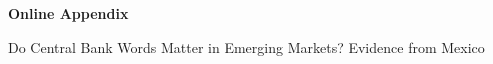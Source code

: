 \documentclass[a4paper, 12pt]{article}
\begin{document}
\newpage
\begin{appendices}
	
	\setcounter{page}{1}
	\renewcommand{\thetable}{A.\arabic{table}}
	\renewcommand\thefigure{A.\arabic{figure}}
	
	\section*{} \label{sec:apptblsfigs}
	\setcounter{table}{0}
	\setcounter{figure}{0}
	\begin{center}
		{\Large \textbf{Online Appendix}
			
			Do Central Bank Words Matter in Emerging Markets? Evidence from Mexico}
	\end{center}
	

\end{appendices}
\end{document}
